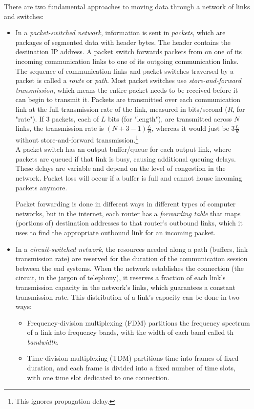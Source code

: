 \documentclass[8pt, table, xcdraw]{article}%
\begin{document}
There are two fundamental approaches to moving data through a network of links and switches:
\begin{itemize}
    \item In a \emph{packet-switched network}, information is sent in \emph{packets}, which are packages of segmented data with header bytes. The header contains the destination IP address. A packet switch forwards packets from on one of its incoming communication links to one of its outgoing communication links. The sequence of communication links and packet switches traversed by a packet is called a \emph{route} or \emph{path}. Most packet switches use \emph{store-and-forward transmission}, which means the entire packet needs to be received before it can begin to transmit it. Packets are transmitted over each communication link at the full transmission rate of the link, measured in bits/second ($R$, for "rate"). If 3 packets, each of $L$ bits (for "length"), are transmitted across $N$ links, the transmission rate is $(N + 3-1) \frac{L}{R}$, whereas it would just be $3 \frac{L}{R}$ without store-and-forward transmission.\footnote{This ignores propagation delay.}\\
A packet switch has an output buffer/queue for each output link, where packets are queued if that link is busy, causing additional queuing delays. These delays are variable and depend on the level of congestion in the network. Packet loss will occur if a buffer is full and cannot house incoming packets anymore.

Packet forwarding is done in different ways in different types of computer networks, but in the internet, each router has a \emph{forwarding table} that maps (portions of) destination addresses to that router's outbound links, which it uses to find the appropriate outbound link for an incoming packet.
\item In a \emph{circuit-switched network}, the resources needed along a path (buffers, link transmission rate) are reserved for the duration of the communication session between the end systems. When the network establishes the connection (the circuit, in the jargon of telephony), it reserves a fraction of each link’s transmission capacity in the network’s links, which guarantees a constant transmission rate. This distribution of a link's capacity can be done in two ways:

\begin{itemize}
    \item Frequency-division multiplexing (FDM) partitions the frequency spectrum of a link into frequency bands, with the width of each band called th \emph{bandwidth}.
    \item Time-division multiplexing (TDM) partitions time into frames of fixed duration, and each frame is
divided into a fixed number of time slots, with one time slot dedicated to one connection.
\end{itemize}

\end{itemize}
\end{document}
